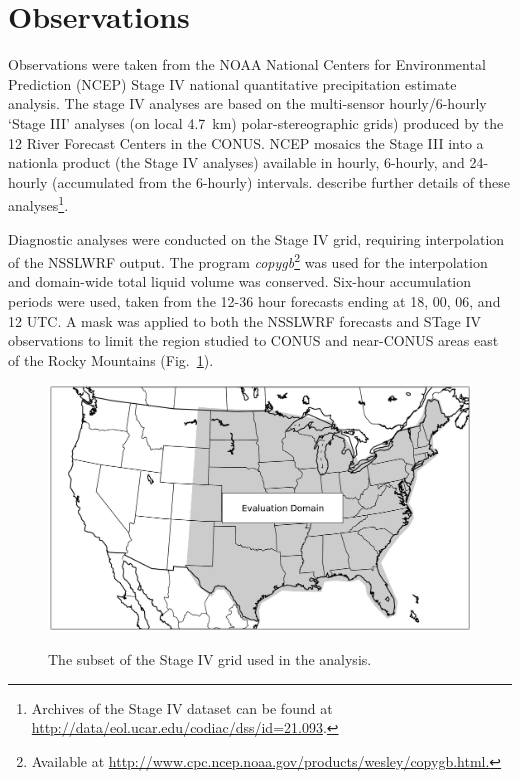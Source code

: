 \section{Observations}
\label{observations}

Observations were taken from the NOAA National Centers for Environmental Prediction (NCEP) Stage IV national quantitative precipitation estimate analysis. The stage IV analyses are based on the multi-sensor hourly/6-hourly `Stage III' analyses (on local \mbox{4.7 km}) polar-stereographic grids) produced by the 12 River Forecast Centers in the CONUS. NCEP mosaics the Stage III into a nationla product (the Stage IV analyses) available in hourly, 6-hourly, and 24-hourly (accumulated from the 6-hourly) intervals. \cite{StageIV} describe further details of these analyses\footnote{Archives of the Stage IV dataset can be found at \url{http://data/eol.ucar.edu/codiac/dss/id=21.093}.}.

Diagnostic analyses were conducted on the Stage IV grid, requiring interpolation of the NSSLWRF output. The program \emph{copygb}\footnote{Available at \url{http://www.cpc.ncep.noaa.gov/products/wesley/copygb.html.}} was used for the interpolation and domain-wide total liquid volume was conserved. Six-hour accumulation periods were used, taken from the 12-36 hour forecasts ending at 18, 00, 06, and 12 UTC. A mask was applied to both the NSSLWRF forecasts and STage IV observations to limit the region studied to CONUS and near-CONUS areas east of the Rocky Mountains \mbox{(Fig. \ref{domain})}.





\newpage

\begin{figure}[ht]
    \centering
    \includegraphics[width=35pc, angle=0]{./deterministic_data/domain.pdf}\\
    \caption{The subset of the Stage IV grid used in the analysis.}
    \label{domain}
\end{figure}

